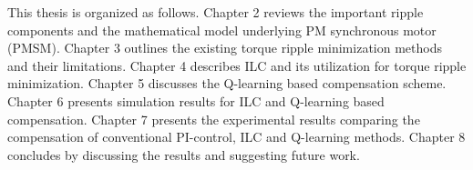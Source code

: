 







This thesis is organized as follows. Chapter 2 reviews the important ripple components and the mathematical model underlying PM synchronous motor (PMSM). Chapter 3 outlines the existing torque ripple minimization methods and their limitations. Chapter 4 describes ILC and its utilization for torque ripple minimization. Chapter 5 discusses the Q-learning based compensation scheme. Chapter 6 presents simulation results for ILC and Q-learning based compensation. Chapter 7 presents the experimental results comparing the compensation of conventional PI-control, ILC and Q-learning methods. Chapter 8 concludes by discussing the results and suggesting future work.
\clearpage
